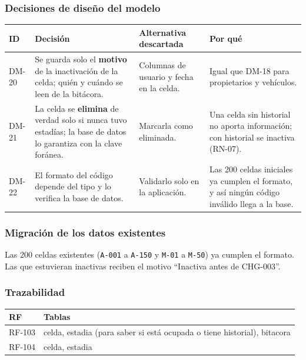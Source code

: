 \subsubsection{Decisiones de diseño del modelo}

\begin{longtable}{>{\raggedright\arraybackslash}p{1.5cm}>{\raggedright\arraybackslash}p{5.3cm}>{\raggedright\arraybackslash}p{2.6cm}>{\raggedright\arraybackslash}p{5.0cm}}
\toprule
\textbf{ID} & \textbf{Decisión} & \textbf{Alternativa descartada} & \textbf{Por qué}\\
\midrule\endhead
DM-20 & Se guarda solo el \textbf{motivo} de la inactivación de la celda; quién y cuándo se leen de la bitácora. & Columnas de usuario y fecha en la celda. & Igual que DM-18 para propietarios y vehículos.\\
DM-21 & La celda se \textbf{elimina} de verdad solo si nunca tuvo estadías; la base de datos lo garantiza con la clave foránea. & Marcarla como eliminada. & Una celda sin historial no aporta información; con historial se inactiva (RN-07).\\
DM-22 & El formato del código depende del tipo y lo verifica la base de datos. & Validarlo solo en la aplicación. & Las 200 celdas iniciales ya cumplen el formato, y así ningún código inválido llega a la base.\\
\bottomrule
\end{longtable}


\subsubsection{Migración de los datos existentes}

Las 200 celdas existentes (\texttt{A-001} a \texttt{A-150} y \texttt{M-01} a \texttt{M-50}) ya cumplen el formato. Las que estuvieran inactivas reciben el motivo ``Inactiva antes de CHG-003''.


\subsubsection{Trazabilidad}

\begin{longtable}{>{\raggedright\arraybackslash}p{2.4cm}>{\raggedright\arraybackslash}p{12.0cm}}
\toprule
\textbf{RF} & \textbf{Tablas}\\
\midrule\endhead
RF-103 & celda, estadia (para saber si está ocupada o tiene historial), bitacora\\
RF-104 & celda, estadia\\
\bottomrule
\end{longtable}
